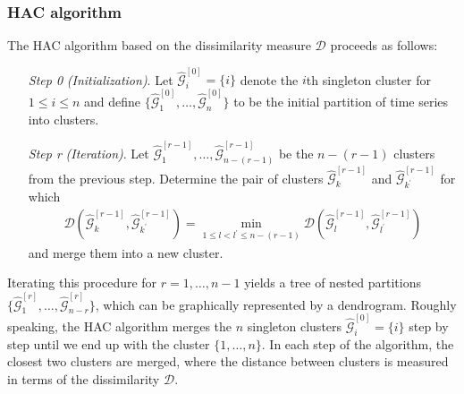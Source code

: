 \documentclass[a4paper,12pt]{article}
\numberwithin{equation}{section}
\begin{document}
\subsubsection{HAC algorithm}\label{sec:alg}


The HAC algorithm based on the dissimilarity measure $\mathcal{D}$ proceeds as follows:
\begin{itemize}[leftmargin=1.4cm]

\item[\textit{Step 0}] \textit{(Initialization)}. Let $\hat{\mathcal{G}}_i^{[0]} = \{i\}$ denote the $i$th singleton cluster for $1 \leq i \leq n$ and define $\{\hat{\mathcal{G}}_1^{[0]}, \ldots, \hat{\mathcal{G}}_n^{[0]}\}$ to be the
initial partition of time series into clusters.

\item[\textit{Step r}] \textit{(Iteration)}. Let $\hat{\mathcal{G}}^{[r-1]}_1, \ldots, \hat{\mathcal{G}}^{[r-1]}_{n - (r-1)}$ be the $n-(r-1)$ clusters from the previous step. Determine the pair of clusters $\hat{\mathcal{G}}^{[r-1]}_k$ and $\hat{\mathcal{G}}^{[r-1]}_{k^\prime}$ for which 
\begin{align*}
\mathcal{D}(\hat{\mathcal{G}}^{[r-1]}_{k}, \hat{\mathcal{G}}^{[r-1]}_{k^\prime}) = \min_{1 \leq l < l^\prime \leq n- (r-1)} \mathcal{D}(\hat{\mathcal{G}}^{[r-1]}_{l}, \hat{\mathcal{G}}^{[r-1]}_{l^\prime})
\end{align*}
and merge them into a new cluster.

\end{itemize}
Iterating this procedure for $r = 1, \ldots, n-1$ yields a tree of nested partitions $\{\hat{\mathcal{G}}^{[r]}_1, \ldots, \hat{\mathcal{G}}^{[r]}_{n-r} \}$, which can be graphically represented by a dendrogram. Roughly speaking, the HAC algorithm merges the $n$ singleton clusters $\hat{\mathcal{G}}^{[0]}_i = \{i\}$ step by step until we end up with the cluster $\{1, \ldots, n\}$. In each step of the algorithm, the closest two clusters are merged, where the distance between clusters is measured in terms of the dissimilarity $\mathcal{D}$. %

\vspace{10pt}
\end{document}
